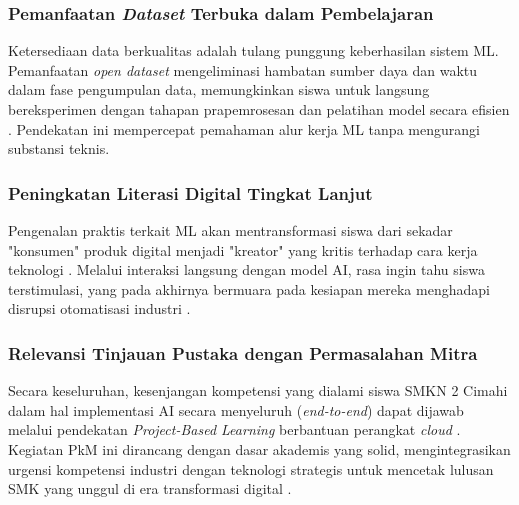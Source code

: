 \subsubsection{Pemanfaatan \textit{Dataset} Terbuka dalam Pembelajaran}
Ketersediaan data berkualitas adalah tulang punggung keberhasilan sistem ML. Pemanfaatan \textit{open dataset} mengeliminasi hambatan sumber daya dan waktu dalam fase pengumpulan data, memungkinkan siswa untuk langsung bereksperimen dengan tahapan prapemrosesan dan pelatihan model secara efisien \parencite{Nugrahanti2025}. Pendekatan ini mempercepat pemahaman alur kerja ML tanpa mengurangi substansi teknis.

\subsubsection{Peningkatan Literasi Digital Tingkat Lanjut}
Pengenalan praktis terkait ML akan mentransformasi siswa dari sekadar "konsumen" produk digital menjadi "kreator" yang kritis terhadap cara kerja teknologi \parencite{Panjaitan2025}. Melalui interaksi langsung dengan model AI, rasa ingin tahu siswa terstimulasi, yang pada akhirnya bermuara pada kesiapan mereka menghadapi disrupsi otomatisasi industri \parencite{Ali2025}.

\subsubsection{Relevansi Tinjauan Pustaka dengan Permasalahan Mitra}
Secara keseluruhan, kesenjangan kompetensi yang dialami siswa SMKN 2 Cimahi dalam hal implementasi AI secara menyeluruh (\textit{end-to-end}) dapat dijawab melalui pendekatan \textit{Project-Based Learning} berbantuan perangkat \textit{cloud} \parencite{Handayani2025}. Kegiatan PkM ini dirancang dengan dasar akademis yang solid, mengintegrasikan urgensi kompetensi industri dengan teknologi strategis untuk mencetak lulusan SMK yang unggul di era transformasi digital \parencite{Andriani2025}.
